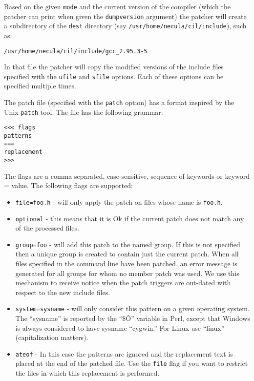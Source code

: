 \documentclass{article}
\def\t#1{{\tt #1}}
\begin{document}
 Based on the given \t{mode} and the current version of the compiler (which
the patcher can print when given the \t{dumpversion} argument) the patcher
will create a subdirectory of the \t{dest} directory (say \t{/usr/home/necula/cil/include}), such as:
\begin{verbatim}
/usr/home/necula/cil/include/gcc_2.95.3-5
\end{verbatim}

 In that file the patcher will copy the modified versions of the include files
specified with the \t{ufile} and \t{sfile} options. Each of these options can
be specified multiple times. 

 The patch file (specified with the \t{patch} option) has a format inspired by
the Unix \t{patch} tool. The file has the following grammar:

\begin{verbatim}
<<< flags
patterns
===
replacement
>>>
\end{verbatim}

 The flags are a comma separated, case-sensitive, sequence of keywords or
keyword = value. The following flags are supported:
\begin{itemize}
\item \t{file=foo.h} - will only apply the patch on files whose name is
                       \t{foo.h}. 
\item \t{optional} - this means that it is Ok if the current patch does not
match any of the processed files. 
\item \t{group=foo} - will add this patch to the named group. If this is not
specified then a unique group is created to contain just the current patch.
When all files specified in the command line have been patched, an error
message is generated for all groups for whom no member patch was used. We use
this mechanism to receive notice when the patch triggers are out-dated with
respect to the new include files. 
\item \t{system=sysname} - will only consider this pattern on a given
operating system. The ``sysname'' is reported by the ``\$\^O'' variable in
Perl, except that Windows is always considered to have sysname
``cygwin.'' For Linux use ``linux'' (capitalization matters).
\item \t{ateof} - In this case the patterns are ignored and the replacement
text is placed at the end of the patched file. Use the \t{file} flag if you
want to restrict the files in which this replacement is performed. 
\end{itemize}
\end{document}
